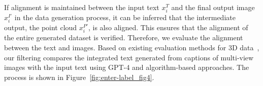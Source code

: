 
If alignment is maintained between the input text $x_{i}^{T}$ and the final output image $x_{i}^{I \prime}$ in the data generation process, it can be inferred that the intermediate output, the point cloud $x_{i}^{P \prime}$, is also aligned. This ensures that the alignment of the entire generated dataset is verified. Therefore, we evaluate the alignment between the text and images. Based on existing evaluation methods for 3D data~\cite{he2023t}, our filtering compares the integrated text generated from captions of multi-view images with the input text using GPT-4 and algorithm-based approaches. The process is shown in Figure~\ref{fig:enter-label_fig4}.

